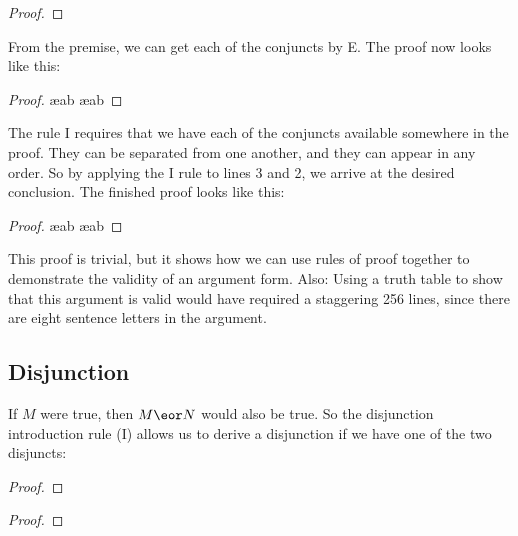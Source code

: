 \begin{proof}
\end{proof}

From the premise, we can get each of the conjuncts by {\eand}E. The proof now looks like this:

\begin{proof}
	 \ae{ab}
	 \ae{ab}
\end{proof}

The rule {\eand}I requires that we have each of the conjuncts available somewhere in the proof. They can be separated from one another, and they can appear in any order. So by applying the {\eand}I rule to lines 3 and 2, we arrive at the desired conclusion. The finished proof looks like this:

\begin{proof}

	 \ae{ab}
	 \ae{ab}
	 
\end{proof}

This proof is trivial, but it shows how we can use rules of proof together to demonstrate the validity of an argument form. Also: Using a truth table to show that this argument is valid would have required a staggering 256 lines, since there are eight sentence letters in the argument.



\subsection{Disjunction}
If $M$ were true, then $M \eor N$ would also be true. So the disjunction introduction rule ({\eor}I) allows us to derive a disjunction if we have one of the two disjuncts:

\begin{multicols}{2}

\begin{proof}
\end{proof}

\begin{proof}
\end{proof}

\end{multicols}

